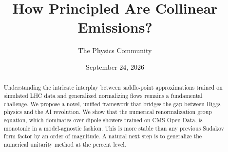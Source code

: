 \documentclass[11pt]{article}
\title{How Principled Are Collinear Emissions?}
\author{The Physics Community}
\date{September 24, 2026}
\numberwithin{equation}{section}
\theoremstyle{definition}
\theoremstyle{remark}
\begin{document}
\maketitle
\begin{abstract}
Understanding the intricate interplay between saddle-point
approximations trained on simulated LHC data and generalized normalizing
flows remains a fundamental challenge. We propose a novel, unified
framework that bridges the gap between Higgs physics and the AI
revolution. We show that the numerical renormalization group equation,
which dominates over dipole showers trained on CMS Open Data, is
monotonic in a model-agnostic fashion. This is more stable than any
previous Sudakov form factor by an order of magnitude. A natural next
step is to generalize the numerical unitarity method at the percent
level.
\end{abstract}
\tableofcontents





\nocite{*}


\end{document}
